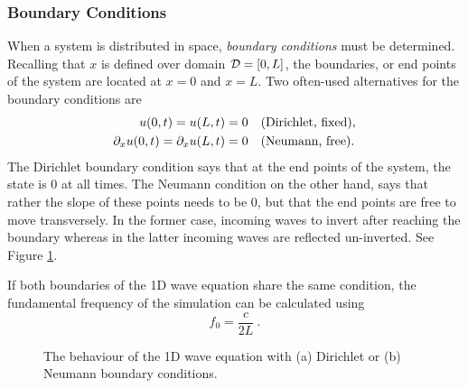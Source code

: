 \subsubsection{Boundary Conditions}
When a system is distributed in space, \textit{boundary conditions} must be determined. Recalling that $x$ is defined over domain $\mathcal{D} = [0, L]$, the boundaries, or end points of the system are located at $x=0$ and $x=L$. Two often-used alternatives for the boundary conditions are
%
\begin{subequations}\label{eq:boundaryCond1DWave}
    \begin{align}
        u(0, t) = u(L, t) &= 0\quad \text{(Dirichlet, fixed)},\label{eq:contDirichlet}\\
        \partial_x u(0, t) = \partial_x u(L, t) &= 0\quad \text{(Neumann, free)}.\label{eq:contNeumann}
    \end{align}
\end{subequations}
%
The Dirichlet boundary condition says that at the end points of the system, the state is 0 at all times. The Neumann condition on the other hand, says that rather the slope of these points needs to be 0, but that the end points are free to move transversely. In the former case, incoming waves to invert after reaching the boundary whereas in the latter incoming waves are reflected un-inverted. See Figure \ref{fig:boundaryCondsCont}.

If both boundaries of the 1D wave equation share the same condition, the fundamental frequency of the simulation can be calculated using 
\begin{equation}\label{eq:fundamentalFreq}
    f_0 = \frac{c}{2L}\ .
\end{equation}

\begin{figure}[t]
    \centering
    \hspace{0.06\textwidth}
    \caption{The behaviour of the 1D wave equation with (a) Dirichlet or (b) Neumann boundary conditions.\label{fig:boundaryCondsCont}}
\end{figure}

